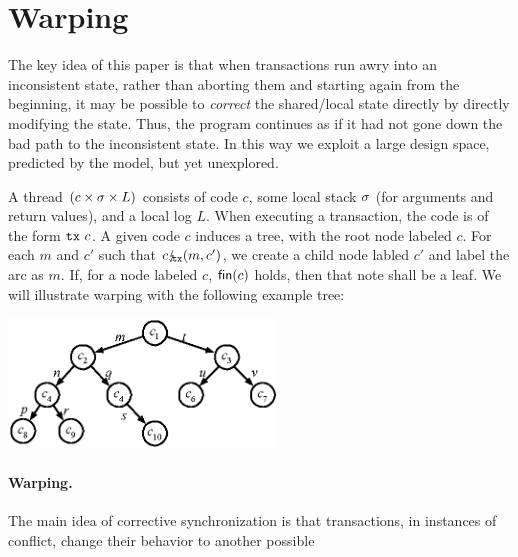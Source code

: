 

\section{Warping}
\label{sect:warping}

The key idea of this paper is that when transactions run
awry into an inconsistent state, rather than aborting them and
starting again from the beginning, it may be possible to
\emph{correct} the shared/local state directly by directly
modifying the state. Thus, the program continues as if it had not
gone down the bad path to the inconsistent state.
In this way we exploit a large design space, predicted by the \PMPY{}
model, but yet unexplored.

A thread $(c\times \sigma \times L)$ consists of code $c$, some local
stack $\sigma$ (for arguments and return values), and a local log
$L$. When executing a transaction, the code is of the form $\texttt{tx}\ c$.
%
A given code $c$ induces a tree, with the root node labeled $c$. For
each $m$ and $c'$ such that $c \lightning_{\mkern-7mu \texttt{tx}} (m,c')$, we create a child node
labled $c'$ and label the arc as $m$. If, for a node labeled $c$,
$\textsf{fin}(c)$ holds, then that note shall be a leaf.  We will
illustrate warping with the following example tree:
\begin{center}
\includegraphics[width=2.8in]{stages0.eps}
\end{center}

\paragraph{Warping.}
The main idea of corrective synchronization is that transactions, in
instances of conflict, change their behavior to another possible

